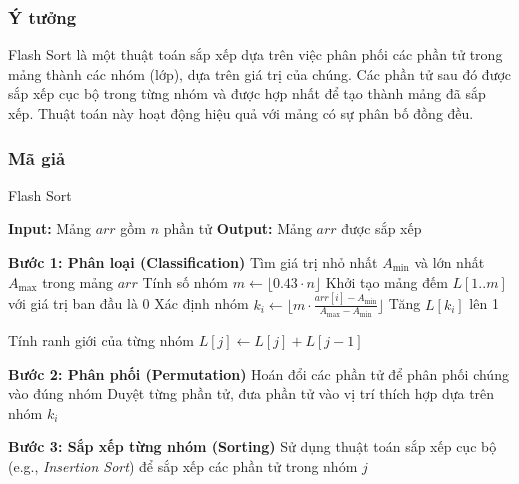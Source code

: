 \subsubsection{Ý tưởng}
Flash Sort là một thuật toán sắp xếp dựa trên việc phân phối các phần tử trong mảng thành các nhóm (lớp), dựa trên giá trị của chúng. Các phần tử sau đó được sắp xếp cục bộ trong từng nhóm và được hợp nhất để tạo thành mảng đã sắp xếp. Thuật toán này hoạt động hiệu quả với mảng có sự phân bố đồng đều.

\subsubsection{Mã giả}

\begin{algorithm}[H]
\caption{Flash Sort}
\begin{algorithmic}[1]
    \State \textbf{Input:} Mảng $arr$ gồm $n$ phần tử
    \State \textbf{Output:} Mảng $arr$ được sắp xếp
    
    \State \textbf{Bước 1: Phân loại (Classification)}
    \State Tìm giá trị nhỏ nhất $A_{\text{min}}$ và lớn nhất $A_{\text{max}}$ trong mảng $arr$
    \State Tính số nhóm $m \gets \lfloor 0.43 \cdot n \rfloor$
    \State Khởi tạo mảng đếm $L[1..m]$ với giá trị ban đầu là 0
        \State Xác định nhóm $k_i \gets \lfloor m \cdot \frac{arr[i] - A_{\text{min}}}{A_{\text{max}} - A_{\text{min}}} \rfloor$
        \State Tăng $L[k_i]$ lên 1
    \EndFor
    
    \State Tính ranh giới của từng nhóm
        \State $L[j] \gets L[j] + L[j-1]$
    \EndFor
    
    \State \textbf{Bước 2: Phân phối (Permutation)}
    \State Hoán đổi các phần tử để phân phối chúng vào đúng nhóm
    \State Duyệt từng phần tử, đưa phần tử vào vị trí thích hợp dựa trên nhóm $k_i$
    
    \State \textbf{Bước 3: Sắp xếp từng nhóm (Sorting)}
        \State Sử dụng thuật toán sắp xếp cục bộ (e.g., \textit{Insertion Sort}) để sắp xếp các phần tử trong nhóm $j$
    \EndFor
\EndProcedure
\end{algorithmic}
\end{algorithm}

